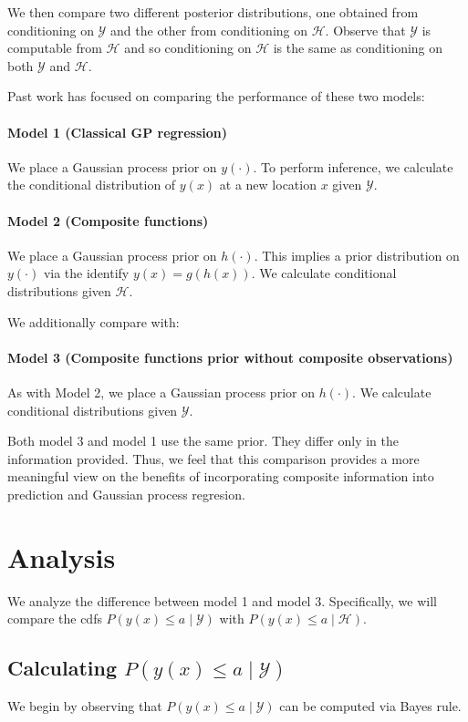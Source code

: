 \documentclass[11pt]{article}
\newcommand{\Y}{\mathcal{Y}}
\renewcommand{\H}{\mathcal{H}}
\begin{document}
We then compare two different posterior distributions, one obtained from conditioning on $\Y$ and the other from conditioning on $\H$. Observe that $\Y$ is computable from $\H$ and so conditioning on $\H$ is the same as conditioning on both $\Y$ and $\H$.

Past work has focused on comparing the performance of these two models:

\paragraph{Model 1 (Classical GP regression)} We place a Gaussian process prior on $y(\cdot)$. To perform inference, we calculate the conditional distribution of $y(x)$ at a new location $x$ given $\Y$.

\paragraph{Model 2 (Composite functions)} We place a Gaussian process prior on $h(\cdot)$. This implies a prior distribution on $y(\cdot)$ via the identify $y(x) = g(h(x))$. We calculate conditional distributions given $\H$.

We additionally compare with:

\paragraph{Model 3 (Composite functions prior without composite observations)} As with Model 2, we place a Gaussian process prior on $h(\cdot)$. We calculate conditional distributions given $\Y$.

Both model 3 and model 1 use the same prior. They differ only in the information provided. Thus, we feel that this comparison provides a more meaningful view on the benefits of incorporating composite information into prediction and Gaussian process regresion.

\section{Analysis}

We analyze the difference between model 1 and model 3.  Specifically, we will compare
the cdfs $P(y(x) \le a \mid \Y)$ with $P(y(x) \le a \mid \H)$.

\subsection{Calculating $P(y(x) \le a \mid \Y)$}
We begin by observing that 
$P(y(x) \le a \mid \Y)$
can be computed via Bayes rule.
\end{document}
